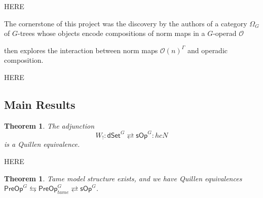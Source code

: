 \documentclass[a4paper,10pt
,draft
]{article}%
\numberwithin{equation}{section}
\numberwithin{figure}{section}
\newtheorem{theorem}[equation]{Theorem}%
\theoremstyle{definition} %
\newtheorem{remark}[equation]{Remark}%
\newcommand{\set}[1]{\left\{#1\right\}}%
\newcommand{\longto}{\longrightarrow}%
\newcommand{\vect}[1]{\text{\overrightharp{\ensuremath{#1}}}}
\newcommand{\sOp}{\ensuremath{\mathsf{sOp}}}%
\newcommand{\dSet}{\mathsf{dSet}}
\DeclareMathOperator{\Hom}{Hom}%
\renewcommand{\O}{\ensuremath{\mathcal O}}
\newcommand{\1}{\ensuremath{\mathbbm 1}}%
\begin{document}
{\color{red} HERE}

The cornerstone of this project was the discovery by the authors of 
a category $\Omega_G$ of $G$-trees 
whose objects encode compositions of norm maps
in a $G$-operad $\O$




 then explores the interaction
between norm maps $\O(n)^{\Gamma}$ and operadic composition.


{\color{red} HERE}


%



\subsection{Main Results}




\begin{theorem}\label{QE THM}
The adjunction
\begin{equation}
      \label{QE_EQ}
      W_! \colon \dSet^G \rightleftarrows \sOp^G \colon hcN
\end{equation}
is a Quillen equivalence.
\end{theorem}


{\color{blue} HERE}



\begin{theorem}
	Tame model structure exists, and we have Quillen equivalences
	$\mathsf{PreOp}^G \leftrightarrows \mathsf{PreOp}^G_{tame} \rightleftarrows \sOp^G$.
\end{theorem}
\end{document}
